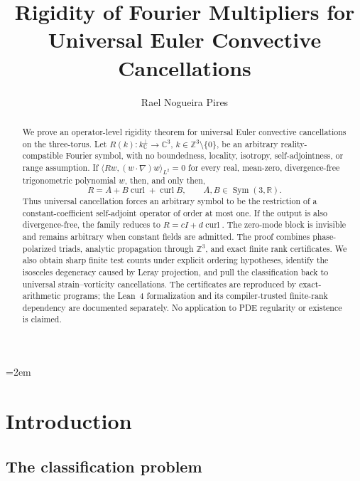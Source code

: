 \documentclass[11pt]{article}
\title{Rigidity of Fourier Multipliers for Universal Euler Convective
Cancellations}
\author{Rael Nogueira Pires}
\date{}
\theoremstyle{definition}
\theoremstyle{remark}
\theoremstyle{plain}
\DeclareMathOperator{\curl}{curl}
\newcommand{\Z}{\mathbb{Z}}
\newcommand{\R}{\mathbb{R}}
\newcommand{\C}{\mathbb{C}}
\newcommand{\kperp}{k_{\C}^{\perp}}
\begin{document}
\emergencystretch=2em

\maketitle

\begin{abstract}
We prove an operator-level rigidity theorem for universal Euler convective
cancellations on the three-torus. Let
$R(k):\kperp\to\C^{3}$, $k\in\Z^{3}\setminus\{0\}$, be an arbitrary
reality-compatible Fourier symbol, with no boundedness, locality, isotropy,
self-adjointness, or range assumption. If
$\langle Rw,(w\cdot\nabla)w\rangle_{L^{2}}=0$ for every real, mean-zero,
divergence-free trigonometric polynomial $w$, then, and only then,
\[
R=A+B\curl+\curl B,
\qquad A,B\in\operatorname{Sym}(3,\R).
\]
Thus universal cancellation forces an arbitrary symbol to be the restriction
of a constant-coefficient self-adjoint operator of order at most one. If the
output is also divergence-free, the family reduces to
$R=cI+d\curl$. The zero-mode block is invisible and remains arbitrary when
constant fields are admitted. The proof combines phase-polarized triads,
analytic propagation through $\Z^{3}$, and exact finite rank certificates.
We also obtain sharp finite test counts under explicit ordering hypotheses,
identify the isosceles degeneracy caused by Leray projection, and pull the
classification back to universal strain--vorticity cancellations. The
certificates are reproduced by exact-arithmetic programs; the Lean~4
formalization and its compiler-trusted finite-rank dependency are documented
separately. No application to PDE regularity or existence is claimed.
\end{abstract}

\tableofcontents

\section{Introduction}
\label{sec:intro}

\subsection{The classification problem}
\label{subsec:problem}
\end{document}
